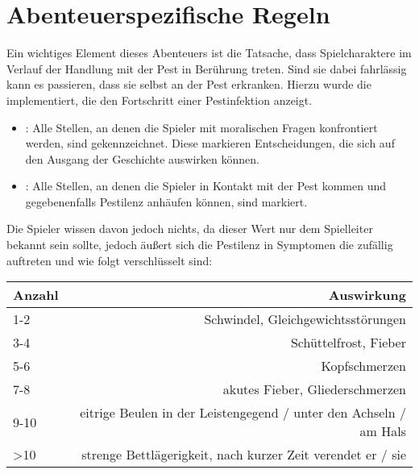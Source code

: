 \section*{Abenteuerspezifische Regeln}

Ein wichtiges Element dieses Abenteuers ist die Tatsache, dass Spielcharaktere im Verlauf der Handlung mit der Pest in Berührung treten. Sind sie dabei fahrlässig kann es passieren, dass sie selbst an der Pest erkranken. Hierzu wurde die  implementiert, die den Fortschritt einer Pestinfektion anzeigt.

\begin{itemize}
  \item {}:
  Alle Stellen, an denen die Spieler mit moralischen Fragen konfrontiert werden, sind  gekennzeichnet. Diese markieren Entscheidungen, die sich auf den Ausgang der Geschichte auswirken können.

  \item {}:
  Alle Stellen, an denen die Spieler in Kontakt mit der Pest kommen und gegebenenfalls Pestilenz anhäufen können, sind  markiert.
\end{itemize}

Die Spieler wissen davon jedoch nichts, da dieser Wert nur dem Spielleiter bekannt sein sollte, jedoch äußert sich die Pestilenz in Symptomen die zufällig auftreten und wie folgt verschlüsselt sind:

\begin{tabular*}{\textwidth}{@{\extracolsep{\fill}} lr}
  \toprule
  Anzahl & Auswirkung \\
  \midrule
  1-2 & Schwindel, Gleichgewichtsstörungen \\
  3-4 & Schüttelfrost, Fieber \\
  5-6 & Kopfschmerzen \\
  7-8 & akutes Fieber, Gliederschmerzen \\
  9-10 & eitrige Beulen in der Leistengegend / unter den Achseln / am Hals \\
  >10 & strenge Bettlägerigkeit, nach kurzer Zeit verendet er / sie \\
  \bottomrule
\end{tabular*}
